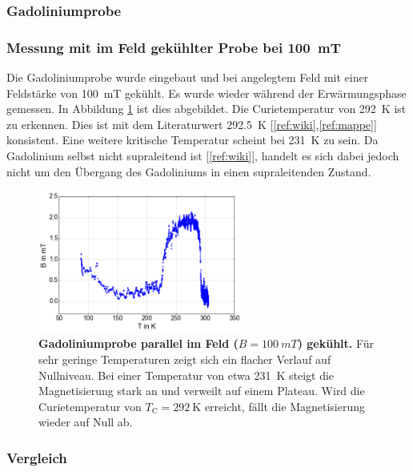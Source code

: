 \documentclass[a4paper,ngerman]{scrartcl}
\begin{document}
\clearpage
\subsubsection{Gadoliniumprobe}

\subsubsection*{Messung mit im Feld gekühlter Probe bei \SI{100}{mT}}

Die Gadoliniumprobe wurde eingebaut und bei angelegtem Feld mit einer Feldstärke von \SI{100}{mT} gekühlt.
Es wurde wieder während der Erwärmungsphase gemessen.
In Abbildung \ref{fig:Gadolinium} ist dies abgebildet.
Die Curietemperatur von \SI{292}{\K} ist zu erkennen.
Dies ist mit dem Literaturwert \SI{292.5}{\K} [\ref{ref:wiki},\ref{ref:mappe}] konsistent.
Eine weitere kritische Temperatur scheint bei \SI{231}{\K} zu sein.
Da Gadolinium selbst nicht supraleitend ist [\ref{ref:wiki}], 
handelt es sich dabei jedoch nicht um den Übergang des Gadoliniums in einen
supraleitenden Zustand.%

\begin{figure}
\centering
\includegraphics[width=0.6\textwidth]{abbildungen/gadolinium.png}
\caption[Gadolinium]{\textbf{Gadoliniumprobe parallel im Feld ($B = \SI{100}{mT}$) gekühlt.} 
Für sehr geringe Temperaturen zeigt sich ein flacher Verlauf auf Nullniveau.
Bei einer Temperatur von etwa \SI{231}{\K} steigt die Magnetisierung stark an und verweilt auf einem Plateau.
Wird die Curietemperatur von $T_{\mathrm{C}} = \SI{292}{\K}$ erreicht, fällt die Magnetisierung wieder auf Null ab.
} 
\label{fig:Gadolinium}
\end{figure}



\subsubsection{Vergleich}
\end{document}
